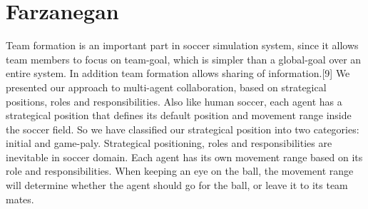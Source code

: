 \section{Farzanegan}
Team formation is an important part in soccer simulation system, since it allows 
team members to focus on team-goal, which is simpler than a global-goal over 
an entire system. In addition team formation allows sharing of information.[9]
We presented our approach to multi-agent collaboration, based on strategical 
positions, roles and responsibilities. Also like human soccer, each agent has a 
strategical position that defines its default position and movement range inside 
the soccer field. So we have classified our strategical position into two 
categories:  initial and  game-paly. Strategical positioning, roles and 
responsibilities are inevitable in soccer domain. 
Each agent has its own movement range based on its role and responsibilities. 
When keeping an eye on the ball, the movement range will determine whether 
the agent should go for the ball, or leave it to its team mates.









